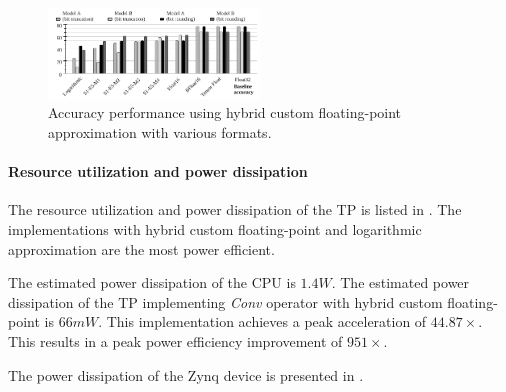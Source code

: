 \begin{figure}[t!]
	\centering
	\includegraphics[width=0.5\textwidth]{../figures/all_models_accuracy.pdf}
	\caption{Accuracy performance using hybrid custom floating-point approximation with various formats.}
	\label{fig:accuracy}
\end{figure}

\paragraph{Resource utilization and power dissipation}
The resource utilization and power dissipation of the TP is listed in . The implementations with hybrid custom floating-point and logarithmic approximation are the most power efficient.

The estimated power dissipation of the CPU is $1.4W$. The estimated power dissipation of the TP implementing \emph{Conv} operator with hybrid custom floating-point is $66mW$. This implementation achieves a peak acceleration of $44.87\times$. This results in a peak power efficiency improvement of $951\times$.

The power dissipation of the Zynq device is presented in .

